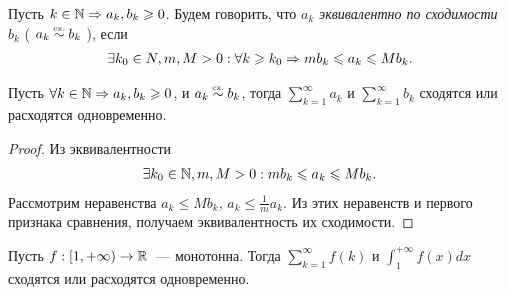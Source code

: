 \documentclass[../main.tex]{subfiles}
\begin{document}
\begin{definition}
  Пусть $ k \in \mathbb{N} \Rightarrow a_k, b_k \geqslant 0$. Будем говорить, что $a_k $ \emph{эквивалентно по сходимости} $b_k $ ( $a_k \eqincon b_k $ ), если 
  \begin{gather} 
    \exists k_0 \in N, m, M > 0: \forall k \geqslant k_0 \Rightarrow mb_k \leqslant a_k \leqslant Mb_k  .
  \end{gather} 
\end{definition}



\begin{proposition}
  Пусть $\forall k \in \mathbb{N} \Rightarrow a_k, b_k \geqslant 0$, и $a_k \eqincon b_k $, тогда $ \sum_{k=1}^{\infty} a_k $ и $ \sum_{k=1}^{\infty} b_k  $ сходятся или расходятся одновременно.  
  
\end{proposition}


\begin{proof}
  Из эквивалентности 
  \begin{gather} 
    \exists k_0 \in \mathbb{N}, m, M > 0: mb_k \leqslant a_k \leqslant Mb_k .
  \end{gather}
  Рассмотрим неравенства $a_k \leq M b_k$, $a_k \leq \frac{1}{m} a_k $. Из этих неравенств и первого признака сравнения, получаем эквивалентность их сходимости.
\end{proof}


\begin{proposition}
  Пусть $f:[1, + \infty) \to \mathbb{R}$~--- монотонна. Тогда $ \sum_{k=1}^{\infty} f(k) $ и $ \int_{1}^{ +\infty} f(x) dx$ сходятся или расходятся одновременно. 
\end{proposition}
\end{document}
